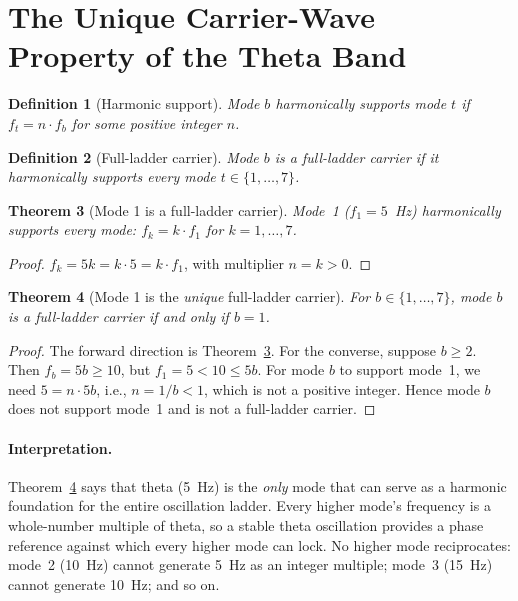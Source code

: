 \documentclass[11pt,a4paper]{article}
\newtheorem{theorem}{Theorem}
\newtheorem{definition}[theorem]{Definition}
\begin{document}
\section{The Unique Carrier-Wave Property of the Theta Band}
\label{sec:carrier}

\begin{definition}[Harmonic support]
\label{def:support}
Mode $b$ \emph{harmonically supports} mode $t$ if $f_t = n \cdot f_b$
for some positive integer $n$.
\end{definition}

\begin{definition}[Full-ladder carrier]
\label{def:carrier}
Mode $b$ is a \emph{full-ladder carrier} if it harmonically supports
every mode $t \in \{1,\ldots,7\}$.
\end{definition}

\begin{theorem}[Mode 1 is a full-ladder carrier]
\label{thm:mode1-carrier}
Mode~1 ($f_1 = 5$~Hz) harmonically supports every mode: $f_k = k
\cdot f_1$ for $k=1,\ldots,7$.
\end{theorem}

\begin{proof}
$f_k = 5k = k \cdot 5 = k \cdot f_1$, with multiplier $n=k>0$.
\end{proof}

\begin{theorem}[Mode 1 is the \emph{unique} full-ladder carrier]
\label{thm:unique-carrier}
For $b \in \{1,\ldots,7\}$, mode $b$ is a full-ladder carrier if and
only if $b=1$.
\end{theorem}

\begin{proof}
The forward direction is Theorem~\ref{thm:mode1-carrier}. For the
converse, suppose $b \geq 2$. Then $f_b = 5b \geq 10$, but
$f_1 = 5 < 10 \leq 5b$. For mode $b$ to support mode~1, we need
$5 = n \cdot 5b$, i.e., $n = 1/b < 1$, which is not a positive integer.
Hence mode $b$ does not support mode~1 and is not a full-ladder carrier.
\end{proof}

\paragraph{Interpretation.} Theorem~\ref{thm:unique-carrier} says that
theta (5~Hz) is the \emph{only} mode that can serve as a harmonic
foundation for the entire oscillation ladder. Every higher mode's
frequency is a whole-number multiple of theta, so a stable theta
oscillation provides a phase reference against which every higher mode
can lock. No higher mode reciprocates: mode~2 (10~Hz) cannot generate
5~Hz as an integer multiple; mode~3 (15~Hz) cannot generate 10~Hz; and
so on.
\end{document}
